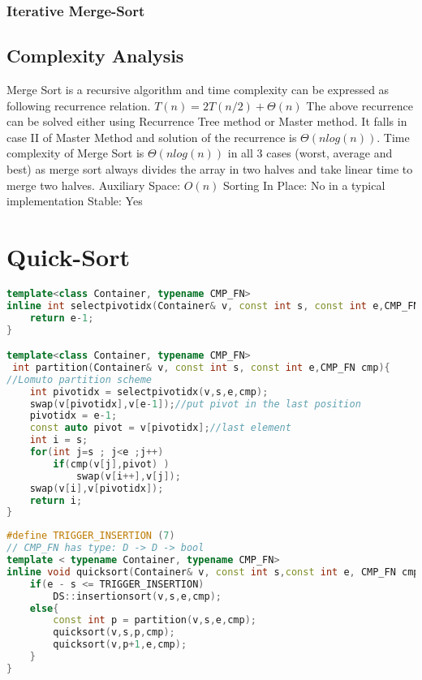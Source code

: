 \subsubsection{Iterative Merge-Sort}

\subsection{Complexity Analysis}

Merge Sort is a recursive algorithm and time complexity can be expressed as following recurrence relation.
$T(n) = 2T(n/2) + \Theta(n)$
The above recurrence can be solved either using Recurrence Tree method or Master method. It falls in case II of Master Method and solution of the recurrence is $\Theta(nlog(n))$.
Time complexity of Merge Sort is $\Theta(nlog(n))$ in all 3 cases (worst, average and best) as merge sort always divides the array in two halves and take linear time to merge two halves.
Auxiliary Space: $O(n)$
Sorting In Place: No in a typical implementation
Stable: Yes




\section{Quick-Sort}

\begin{lstlisting}[language=c++, caption="QuickSort Partition"]
template<class Container, typename CMP_FN>
inline int selectpivotidx(Container& v, const int s, const int e,CMP_FN cmp){
    return e-1;
}

template<class Container, typename CMP_FN>
 int partition(Container& v, const int s, const int e,CMP_FN cmp){
//Lomuto partition scheme
    int pivotidx = selectpivotidx(v,s,e,cmp);
    swap(v[pivotidx],v[e-1]);//put pivot in the last position
    pivotidx = e-1;
    const auto pivot = v[pivotidx];//last element
    int i = s;
    for(int j=s ; j<e ;j++)
        if(cmp(v[j],pivot) )
            swap(v[i++],v[j]);
    swap(v[i],v[pivotidx]);
    return i;
}
\end{lstlisting}



\begin{lstlisting}[language=c++, caption="QuickSort Recursive"]
#define TRIGGER_INSERTION (7)
// CMP_FN has type: D -> D -> bool
template < typename Container, typename CMP_FN>
inline void quicksort(Container& v, const int s,const int e, CMP_FN cmp) {
    if(e - s <= TRIGGER_INSERTION)
        DS::insertionsort(v,s,e,cmp);
    else{
        const int p = partition(v,s,e,cmp);
        quicksort(v,s,p,cmp);
        quicksort(v,p+1,e,cmp);
    }
}
\end{lstlisting}


